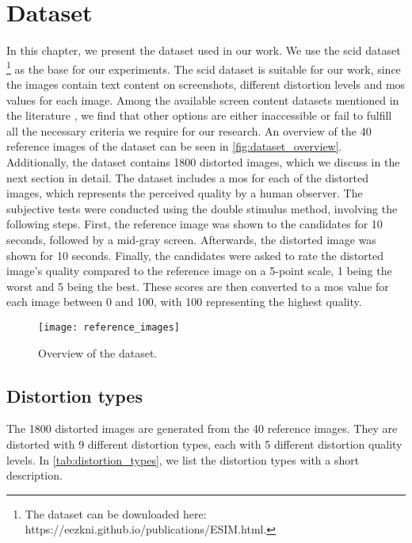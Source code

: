 \chapter{Dataset}
\label{chap:dataset}
In this chapter, we present the dataset used in our work.
We use the \gls{scid} dataset \cite{ni_esim_2017}\footnote{The dataset can be downloaded here: https://eezkni.github.io/publications/ESIM.html.} as the base for our experiments.
The \gls{scid} dataset is suitable for our work, since the images contain text content on screenshots, different distortion levels and \gls{mos} values for each image.
Among the available screen content datasets mentioned in the literature \cite{iqa_survey_2020}, we find that other options are either inaccessible or fail to fulfill all the necessary criteria we require for our research.
An overview of the 40 reference images of the dataset can be seen in \autoref{fig:dataset_overview}.
Additionally, the dataset contains 1800 distorted images, which we discuss in the next section in detail.
The dataset includes a \gls{mos} for each of the distorted images, which represents the perceived quality by a human observer.
The subjective tests were conducted using the double stimulus method, involving the following steps.
First, the reference image was shown to the candidates for 10 seconds, followed by a mid-gray screen.
Afterwards, the distorted image was shown for 10 seconds.
Finally, the candidates were asked to rate the distorted image's quality compared to the reference image on a 5-point scale, 1 being the worst and 5 being the best.
These scores are then converted to a \gls{mos} value for each image between 0 and 100, with 100 representing the highest quality.



\begin{figure}[h!]
    \centering
    \texttt{[image: reference\_images]}
    \caption{Overview of the dataset.}
    \label{fig:dataset_overview}
\end{figure}


\section{Distortion types}
\label{sec:dataset_distortion_types}


The 1800 distorted images are generated from the 40 reference images.
They are distorted with 9 different distortion types, each with 5 different distortion quality levels.
In \autoref{tab:distortion_types}, we list the distortion types with a short description.


